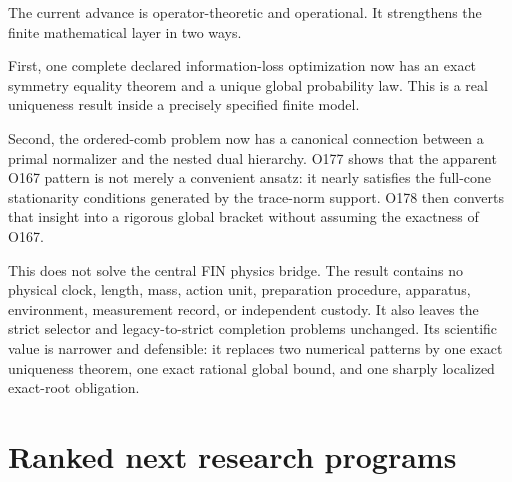 \documentclass[11pt,a4paper,openany]{report}
\begin{document}
The current advance is operator-theoretic and operational. It strengthens the finite mathematical layer in two ways.

First, one complete declared information-loss optimization now has an exact symmetry equality theorem and a unique global probability law. This is a real uniqueness result inside a precisely specified finite model.

Second, the ordered-comb problem now has a canonical connection between a primal normalizer and the nested dual hierarchy. O177 shows that the apparent O167 pattern is not merely a convenient ansatz: it nearly satisfies the full-cone stationarity conditions generated by the trace-norm support. O178 then converts that insight into a rigorous global bracket without assuming the exactness of O167.

This does not solve the central FIN physics bridge. The result contains no physical clock, length, mass, action unit, preparation procedure, apparatus, environment, measurement record, or independent custody. It also leaves the strict selector and legacy-to-strict completion problems unchanged. Its scientific value is narrower and defensible: it replaces two numerical patterns by one exact uniqueness theorem, one exact rational global bound, and one sharply localized exact-root obligation.

\chapter{Ranked next research programs}
\end{document}
